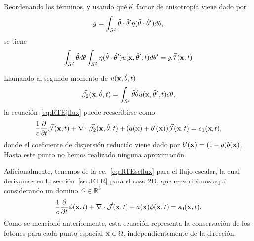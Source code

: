 Reordenando los términos, y usando qué
el factor de anisotropía viene dado por 
\begin{equation}
g=\int_{S^2} \hat{\theta} \cdot \hat{\theta}' \eta(\hat{\theta} \cdot \hat{\theta}') d\theta,
\label{eq:gnorm}
\end{equation}
se tiene 
\begin{equation}
\begin{split}
\begin{aligned}
\int_{S^2} \hat{\theta} d\theta \int_{S^2} \eta(\hat{\theta} \cdot \hat{\theta}')  u(\mathbf{x},\hat{\theta}',t) d\theta' 
=g \vec{ \mathcal{J}}(\mathbf{x},t)
\end{aligned}
\end{split}
\label{eq:RTEjint}
\end{equation}

Llamando al segundo momento de $u(\mathbf{x},\hat{\theta},t)$
\begin{equation}
\vec{ \mathcal{J}}_2(\mathbf{x},\hat{\theta},t)=\int_{S^2} \hat{\theta} \hat{\theta} u(\mathbf{x},\hat{\theta}',t)  d\theta,
\label{eq:RTEjflux2}
\end{equation}
la ecuación~\eqref{eq:RTEjflux} puede reescribirse como
\begin{equation}
\begin{split}
\begin{aligned}
\frac{1}{c}\frac{\partial}{\partial t} \vec{ \mathcal{J}}(\mathbf{x},t)+\nabla \cdot \vec{ \mathcal{J}}_2(\mathbf{x},\hat{\theta},t)+(a(\mathbf{x})+b'(\mathbf{x}))\vec{ \mathcal{J}}(\mathbf{x},t)=s_1(\mathbf{x},t),
\end{aligned}
\end{split}
\label{eq:RTEjfluxf}
\end{equation}
donde el coeficiente de dispersión reducido viene dado por $b'(\mathbf{x})=(1-g)b(\mathbf{x})$.
Hasta este punto no hemos realizado ninguna aproximación.

Adicionalmente, tenemos de la ec.~\eqref{eq:RTEscflux} para el flujo escalar, la cual derivamos en la 
sección~\ref{sec:ETR} para el caso 2D, que reescribimos aquí considerando un domino $\Omega \in \mathbb{R}^3$
\begin{equation}
\frac{1}{c}\frac{\partial}{\partial t} \phi(\mathbf{x},t)+\nabla \cdot \vec{ \mathcal{J}}(\mathbf{x},t)
+a(\mathbf{x})\phi(\mathbf{x},t)=s_0(\mathbf{x},t).
\label{eq:RTEscfluxap}
\end{equation}
Como se mencionó anteriormente, esta ecuación representa la conservación 
de los fotones para cada punto espacial $\mathbf{x} \in \Omega$, independientemente 
de la dirección. 

